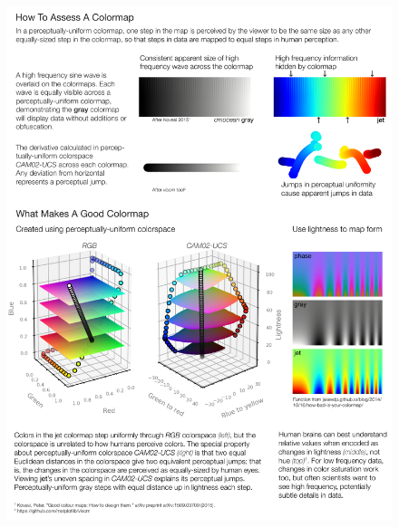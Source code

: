 \documentclass[10pt,journal,compsoc]{IEEEtran}
\begin{document}
\begin{figure}
	\includegraphics[width=\textwidth]{figures/evaluation.pdf}
	\caption{}
	\label{fig:evaluation}
\end{figure}
\end{document}
